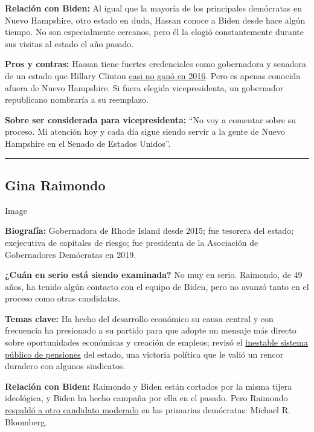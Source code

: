 \textbf{Relación con Biden:} Al igual que la mayoría de los principales
demócratas en Nuevo Hampshire, otro estado en duda, Hassan conoce a
Biden desde hace algún tiempo. No son especialmente cercanos, pero él la
elogió constantemente durante sus visitas al estado el año pasado.

\textbf{Pros y contras:} Hassan tiene fuertes credenciales como
gobernadora y senadora de un estado que Hillary Clinton
\href{https://www.nytimes3xbfgragh.onion/2016/11/09/us/politics/new-hampshire-senate-hassan-ayotte.html}{casi
no ganó en 2016}. Pero es apenas conocida afuera de Nuevo Hampshire. Si
fuera elegida vicepresidenta, un gobernador republicano nombraría a su
reemplazo.

\textbf{Sobre ser considerada para vicepresidenta:} ``No voy a comentar
sobre su proceso. Mi atención hoy y cada día sigue siendo servir a la
gente de Nuevo Hampshire en el Senado de Estados Unidos''.

\begin{center}\rule{0.5\linewidth}{\linethickness}\end{center}

\hypertarget{gina-raimondo}{%
\subsection{Gina Raimondo}\label{gina-raimondo}}

Image

\textbf{Biografía:} Gobernadora de Rhode Island desde 2015; fue tesorera
del estado; exejecutiva de capitales de riesgo; fue presidenta de la
Asociación de Gobernadores Demócratas en 2019.

\textbf{¿Cuán en serio está siendo examinada?} No muy en serio.
Raimondo, de 49 años, ha tenido algún contacto con el equipo de Biden,
pero no avanzó tanto en el proceso como otras candidatas.

\textbf{Temas clave:} Ha hecho del desarrollo económico su causa central
y con frecuencia ha presionado a su partido para que adopte un mensaje
más directo sobre oportunidades económicas y creación de empleos; revisó
el
\href{https://www.nytimes3xbfgragh.onion/2015/09/26/business/dealbook/rhode-island-averts-pension-disaster-without-raising-taxes.html}{inestable
sistema público de pensiones} del estado, una victoria política que le
valió un rencor duradero con algunos sindicatos.

\textbf{Relación con Biden:} Raimondo y Biden están cortados por la
misma tijera ideológica, y Biden ha hecho campaña por ella en el pasado.
Pero Raimondo
\href{https://www.nytimes3xbfgragh.onion/2019/11/24/us/politics/michael-bloomberg-2020-presidency.html}{respaldó
a otro candidato moderado} en las primarias demócratas: Michael R.
Bloomberg.

